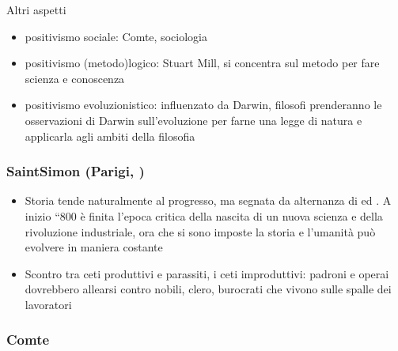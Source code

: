 \documentclass[letterpaper,10pt,italian]{jupyterBook}
\begin{document}
\sphinxAtStartPar
Altri aspetti
\begin{itemize}
\item {} 
\sphinxAtStartPar
positivismo sociale: Comte, sociologia

\item {} 
\sphinxAtStartPar
positivismo (metodo)logico: Stuart Mill, si concentra sul metodo per fare scienza e conoscenza

\item {} 
\sphinxAtStartPar
positivismo evoluzionistico: influenzato da Darwin, filosofi prenderanno le osservazioni di Darwin sull’evoluzione per farne una legge di natura e applicarla agli ambiti della filosofia

\end{itemize}

\sphinxAtStartPar
{}

\label{\detokenize{ch/history:pc-saint-simon}}\subsubsection*{Saint\sphinxhyphen{}Simon (Parigi, )}

\sphinxAtStartPar
{}
\begin{itemize}
\item {} 
\sphinxAtStartPar
Storia tende naturalmente al progresso, ma segnata da alternanza di  ed . A inizio “800 è finita l’epoca critica della nascita di un nuova scienza e della rivoluzione industriale, ora che si sono imposte la storia e l’umanità può evolvere in maniera costante

\item {} 
\sphinxAtStartPar
Scontro tra ceti produttivi e parassiti, i ceti improduttivi: padroni e operai dovrebbero allearsi contro nobili, clero, burocrati che vivono sulle spalle dei lavoratori

\end{itemize}
\label{\detokenize{ch/history:pc-comte}}\subsubsection*{Comte}
\end{document}
